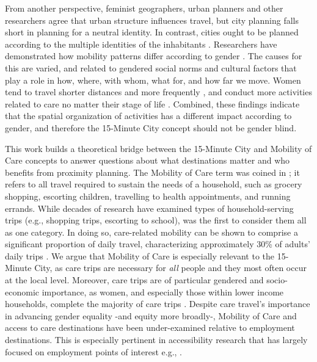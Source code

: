 \documentclass[
  authoryear,
  preprint,
  3p]{elsarticle}
\begin{document}
From another perspective, feminist geographers, urban planners and other
researchers agree that urban structure influences travel, but city
planning falls short in planning for a neutral identity. In contrast,
cities ought to be planned according to the multiple identities of the
inhabitants
\citep{vacchelli_towards_2018, urbandevelopmentviennaGenderMainstreamingUrban2013}.
Researchers have demonstrated how mobility patterns differ according to
gender
\citep{lawWomenTransportNew1999, cresswell_gendered_2008, levy2013travel, little_gender_1994, tronto_toward_1990, neto_gender_2015}.
The causes for this are varied, and related to gendered social norms and
cultural factors that play a role in how, where, with whom, what for,
and how far we move. Women tend to travel shorter distances and more
frequently \citep{roorda_triap_2010, morency_distance_2011}, and conduct
more activities related to care no matter their stage of life
\citep{ilo_care_2018, garciaromanGenderDifferencesTime2022}. Combined,
these findings indicate that the spatial organization of activities has
a different impact according to gender, and therefore the 15-Minute City
concept should not be gender blind.

This work builds a theoretical bridge between the 15-Minute City and
Mobility of Care concepts to answer questions about what destinations
matter and who benefits from proximity planning. The Mobility of Care
term was coined in
\citet{sanchezdemadariagaMobilityCareIntroducing2013}; it refers to all
travel required to sustain the needs of a household, such as grocery
shopping, escorting children, travelling to health appointments, and
running errands. While decades of research have examined types of
household-serving trips (e.g., shopping trips, escorting to school),
\citet{sanchezdemadariagaMobilityCareIntroducing2013} was the first to
consider them all as one category. In doing so, care-related mobility
can be shown to comprise a significant proportion of daily travel,
characterizing approximately 30\% of adults' daily trips
\citep{sanchezdemadariagaMobilityCareIntroducing2013, sanchezdemadariagaMeasuringMobilitiesCare2019, ravensbergen2023exploratory}.
We argue that Mobility of Care is especially relevant to the 15-Minute
City, as care trips are necessary for \emph{all} people and they most
often occur at the local level. Moreover, care trips are of particular
gendered and socio-economic importance, as women, and especially those
within lower income households, complete the majority of care trips
\citep{ravensbergen2023exploratory}. Despite care travel's importance in
advancing gender equality -and equity more broadly-, Mobility of Care
and access to care destinations have been under-examined relative to
employment destinations. This is especially pertinent in accessibility
research that has largely focused on employment points of interest e.g.,
\citep{farberOntarioLineSocioeconomic2019, duarteInfluenceJobAccessibility2023, ryanAccessibilitySpaceTime2023}.
\end{document}
